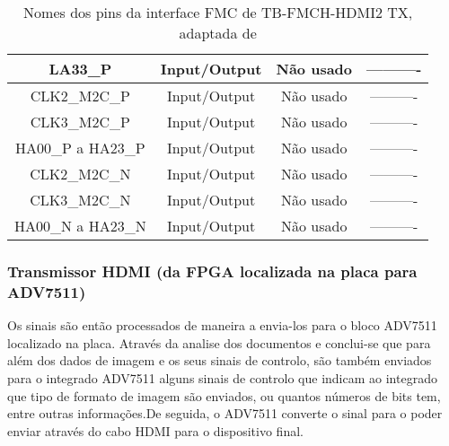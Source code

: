 \begin{table}[h!]
\begin{tabular}{|c|c|c|c|}
			LA33\_P              & Input/Output          & Não usado              & ----------                     \\ \hline
			CLK2\_M2C\_P         & Input/Output          & Não usado              & ----------                     \\ \hline
			CLK3\_M2C\_P         & Input/Output          & Não usado              & ----------                     \\ \hline
			HA00\_P a HA23\_P    & Input/Output          & Não usado              & ----------                     \\ \hline
			CLK2\_M2C\_N         & Input/Output          & Não usado              & ----------                     \\ \hline
			CLK3\_M2C\_N         & Input/Output          & Não usado              & ----------                     \\ \hline
			HA00\_N a HA23\_N    & Input/Output          & Não usado              & ----------                     \\ \hline
		\end{tabular}
			\caption{Nomes dos pins da interface FMC de TB-FMCH-HDMI2 TX, adaptada de \cite{R009}}
			\label{table:HDMIdataTX}
	\end{table}



	
	

	
\subsubsection{Transmissor HDMI (da FPGA localizada na placa para ADV7511)}

Os sinais são então processados de maneira a envia-los para o bloco ADV7511 localizado na placa. Através da analise dos documentos \cite{R017} e \cite{R018} conclui-se que para além dos dados de imagem e os seus sinais de controlo, são também enviados para o integrado ADV7511 alguns sinais de controlo que indicam ao integrado que tipo de formato de imagem são enviados, ou quantos números de bits tem, entre outras informações.De seguida, o ADV7511 converte o sinal para o poder enviar através do cabo HDMI para o dispositivo final. 




